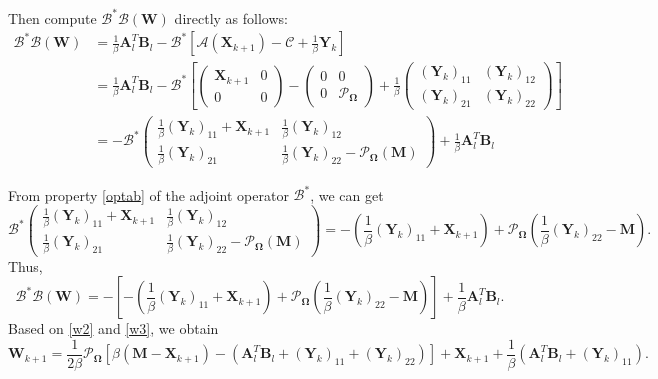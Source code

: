 \documentclass{article}
\begin{document}
{Then compute $	\mathcal{B}^*\mathcal{B}(\mathbf W)$ directly as follows:
\begin{align*}
    \mathcal{B}^*\mathcal{B}(\mathbf W) &=  \frac{1}{\beta}\mathbf A_l^T\mathbf B_l - \mathcal{B}^*\left[ \mathcal{A} (\mathbf X_{k+1} ) - \mathcal{C} +\frac{1}{\beta} \mathbf Y_k \right] \\
    & = \frac{1}{\beta}\mathbf A_l^T\mathbf B_l - \mathcal{B}^*\left[\begin{pmatrix}
        \mathbf X_{k+1} & 0 \\
        0 & 0
    \end{pmatrix} - 
    \begin{pmatrix}
        0 & 0 \\
        0 & \mathcal{P}_{\mathbf\Omega}
    \end{pmatrix} + \frac{1}{\beta} 
    \begin{pmatrix}
        (\mathbf Y_k)_{11} & (\mathbf Y_k)_{12} \\
        (\mathbf Y_k)_{21} & (\mathbf Y_k)_{22}
    \end{pmatrix}\right] \\
    & = -\mathcal{B}^*\begin{pmatrix}
        \frac{1}{\beta} (\mathbf Y_k)_{11} + \mathbf X_{k+1} & \frac{1}{\beta} (\mathbf Y_k)_{12} \\
        \frac{1}{\beta} (\mathbf Y_k)_{21} & \frac{1}{\beta} (\mathbf Y_k)_{22} - \mathcal{P}_{\mathbf\Omega}(\mathbf M)
    \end{pmatrix} + \frac{1}{\beta}\mathbf A_l^T\mathbf B_l
\end{align*}

From property \eqref{optab} of the adjoint operator $\mathcal{B}^*$, we can get 
\begin{equation*}
    \mathcal{B}^* \begin{pmatrix}
                \frac{1}{\beta} (\mathbf Y_k)_{11} + \mathbf X_{k+1} & \frac{1}{\beta} (\mathbf Y_k)_{12} \\
        \frac{1}{\beta} (\mathbf Y_k)_{21} & \frac{1}{\beta} (\mathbf Y_k)_{22} - \mathcal{P}_{\mathbf\Omega}(\mathbf M)
    \end{pmatrix} = -\left(\frac{1}{\beta}(\mathbf Y_k)_{11} + \mathbf X_{k+1} \right) + \mathcal{P}_{\mathbf\Omega}(\frac{1}{\beta} (\mathbf Y_k)_{22}-\mathbf M).
\end{equation*}
Thus,
\begin{equation}
    \mathcal{B}^*\mathcal{B}(\mathbf W) = - \left[-\left(\frac{1}{\beta}(\mathbf Y_k)_{11} + \mathbf X_{k+1} \right) + \mathcal{P}_{\mathbf\Omega}(\frac{1}{\beta} (\mathbf Y_k)_{22}-\mathbf M) \right] + \frac{1}{\beta}\mathbf A_l^T\mathbf B_l.\label{w3}
\end{equation}
Based on \eqref{w2} and \eqref{w3}, we obtain
\begin{equation}
    \mathbf W_{k+1} = \frac{1}{2\beta} \mathcal{P}_{\mathbf\Omega} [\beta(\mathbf M-\mathbf X_{k+1}) - (\mathbf A_l^T\mathbf B_l + (\mathbf Y_k)_{11}+ (\mathbf Y_k)_{22})] + \mathbf X_{k+1} +  \frac{1}{\beta}(\mathbf A_l^T\mathbf B_l + (\mathbf Y_k)_{11}).
\end{equation}

}
\end{document}
